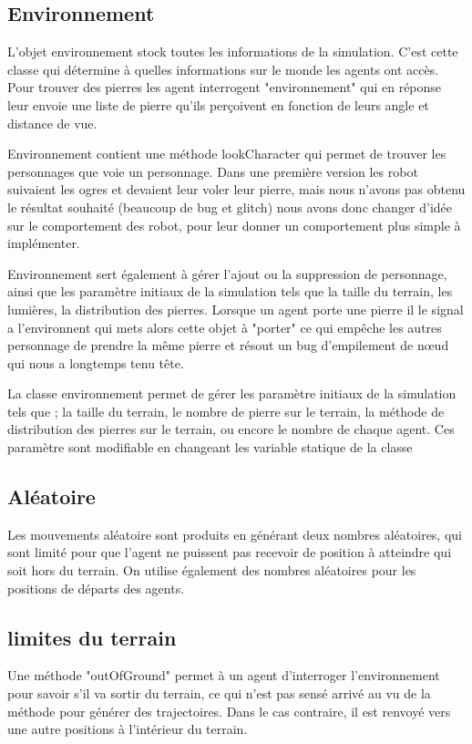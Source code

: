 \subsection{Environnement}
L'objet environnement stock toutes les informations de la simulation. C'est cette classe qui détermine à quelles informations sur le monde les agents ont accès. Pour trouver des pierres les agent interrogent "environnement" qui en réponse leur envoie une liste de pierre qu'ils perçoivent en fonction de leurs angle et distance de vue.

Environnement contient une méthode lookCharacter qui permet de trouver les personnages que voie un personnage. Dans une première version les robot suivaient les ogres et devaient leur voler leur pierre, mais nous n'avons pas obtenu le résultat souhaité (beaucoup de bug et glitch) nous avons donc changer d'idée sur le comportement des robot, pour leur donner un comportement plus simple à implémenter.

Environnement sert également à gérer l'ajout ou la suppression de personnage, ainsi que les paramètre initiaux de la simulation tels que la taille du terrain, les lumières, la distribution des pierres. Lorsque un agent porte une pierre il le signal a l'environnent qui mets alors cette objet à "porter" ce qui empêche les autres personnage de prendre la même pierre et résout un bug d'empilement de nœud qui nous a longtemps tenu tête.

La classe environnement permet de gérer les paramètre initiaux de la simulation tels que ; la taille du terrain, le nombre de pierre sur le terrain, la méthode de distribution des pierres sur le terrain, ou encore le nombre de chaque agent. Ces paramètre sont modifiable en changeant les variable statique de la classe
\subsection{Aléatoire}
Les mouvements aléatoire sont produits en générant deux nombres
aléatoires, qui sont limité pour que l'agent ne puissent pas recevoir
de position à atteindre qui soit hors du terrain.  On utilise
également des nombres aléatoires pour les positions de départs des
agents.

\subsection{limites du terrain}

Une méthode "outOfGround" permet à un agent d'interroger
l'environnement pour savoir s'il va sortir du terrain, ce qui n'est
pas sensé arrivé au vu de la méthode pour générer des trajectoires. Dans le cas contraire, il est renvoyé vers une autre positions à l'intérieur du terrain.

